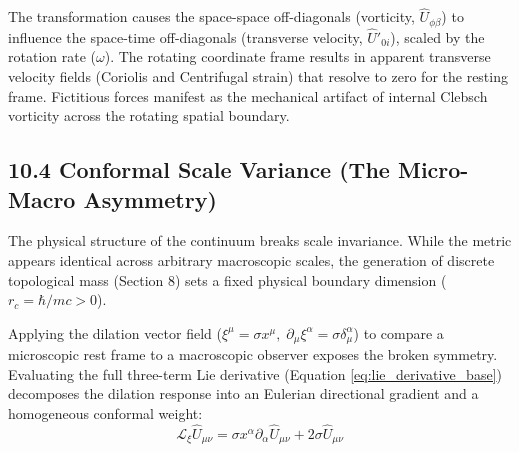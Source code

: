 The transformation causes the space-space off-diagonals (vorticity, $\hat{U}_{\phi\beta}$) to influence the space-time off-diagonals (transverse velocity, $\hat{U}'_{0i}$), scaled by the rotation rate ($\omega$). The rotating coordinate frame results in apparent transverse velocity fields (Coriolis and Centrifugal strain) that resolve to zero for the resting frame. Fictitious forces manifest as the mechanical artifact of internal Clebsch vorticity across the rotating spatial boundary. 

\subsection*{10.4 Conformal Scale Variance (The Micro-Macro Asymmetry)}
The physical structure of the continuum breaks scale invariance. While the metric appears identical across arbitrary macroscopic scales, the generation of discrete topological mass (Section 8) sets a fixed physical boundary dimension ($r_c = \hbar/mc > 0$).

Applying the dilation vector field ($\xi^\mu = \sigma x^\mu, \; \partial_\mu \xi^\alpha = \sigma \delta^\alpha_\mu$) to compare a microscopic rest frame to a macroscopic observer exposes the broken symmetry. Evaluating the full three-term Lie derivative (Equation \ref{eq:lie_derivative_base}) decomposes the dilation response into an Eulerian directional gradient and a homogeneous conformal weight:
\begin{equation}
    \mathcal{L}_\xi \hat{U}_{\mu\nu} = \sigma x^\alpha \partial_\alpha \hat{U}_{\mu\nu} + 2\sigma \hat{U}_{\mu\nu} %
\end{equation}

